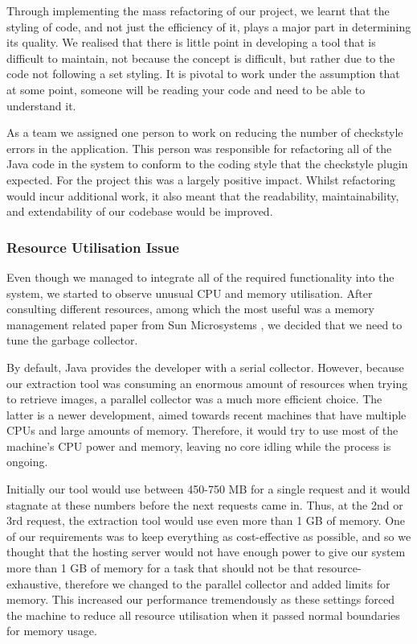 \documentclass{l3proj}
\begin{document}
Through implementing the mass refactoring of our project, we learnt that the styling of code, and not just the efficiency of it, plays a major part in determining its quality. We realised that there is little point in developing a tool that is difficult to maintain, not because the concept is difficult, but rather due to the code not following a set styling. It is pivotal to work under the assumption that at some point, someone will be reading your code and need to be able to understand it.

As a team we assigned one person to work on reducing the number of checkstyle errors in the application. This person was responsible for refactoring all of the Java code in the system to conform to the coding style that the checkstyle plugin expected. For the project this was a largely positive impact. Whilst refactoring would incur additional work, it also meant that the readability, maintainability, and extendability of our codebase would be improved.

\subsubsection{Resource Utilisation Issue}
\label{sec:resource_util}
Even though we managed to integrate all of the required functionality into the system, we started to observe unusual CPU and memory utilisation. After consulting different resources, among which the most useful was a memory management related paper from Sun Microsystems \cite{Memory-Management}, we decided that we need to tune the garbage collector.

By default, Java provides the developer with a serial collector. However, because our extraction tool was consuming an enormous amount of resources when trying to retrieve images, a parallel collector was a much more efficient choice. The latter is a newer development, aimed towards recent machines that have multiple CPUs and large amounts of memory. Therefore, it would try to use most of the machine's CPU power and memory, leaving no core idling while the process is ongoing.

Initially our tool would use between 450-750 MB for a single request and it would stagnate at these numbers before the next requests came in. Thus, at the 2nd or 3rd request, the extraction tool would use even more than 1 GB of memory. One of our requirements was to keep everything as cost-effective as possible, and so we thought that the hosting server would not have enough power to give our system more than 1 GB of memory for a task that should not be that resource-exhaustive, therefore we changed to the parallel collector and added limits for memory. This increased our performance tremendously as these settings forced the machine to reduce all resource utilisation when it passed normal boundaries for memory usage. 
\end{document}
